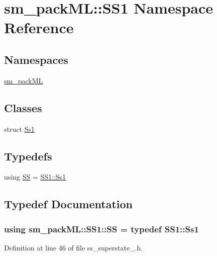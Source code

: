 \hypertarget{namespacesm__packML_1_1SS1}{}\section{sm\+\_\+pack\+ML\+:\+:S\+S1 Namespace Reference}
\label{namespacesm__packML_1_1SS1}
\subsection*{Namespaces}
\begin{DoxyCompactItemize}
\item 
 \hyperlink{namespacesm__packML_1_1SS1_1_1sm__packML}{sm\+\_\+pack\+ML}
\end{DoxyCompactItemize}
\subsection*{Classes}
\begin{DoxyCompactItemize}
\item 
struct \hyperlink{structsm__packML_1_1SS1_1_1Ss1}{Ss1}
\end{DoxyCompactItemize}
\subsection*{Typedefs}
\begin{DoxyCompactItemize}
\item 
using \hyperlink{namespacesm__packML_1_1SS1_a5f8b8355586649e418946858b4b6dfe6}{SS} = \hyperlink{structsm__packML_1_1SS1_1_1Ss1}{S\+S1\+::\+Ss1}
\end{DoxyCompactItemize}


\subsection{Typedef Documentation}
\subsubsection[{\texorpdfstring{SS}{SS}}]{\setlength{\rightskip}{0pt plus 5cm}using {\bf sm\+\_\+pack\+M\+L\+::\+S\+S1\+::\+SS} = typedef {\bf S\+S1\+::\+Ss1}}\hypertarget{namespacesm__packML_1_1SS1_a5f8b8355586649e418946858b4b6dfe6}{}\label{namespacesm__packML_1_1SS1_a5f8b8355586649e418946858b4b6dfe6}


Definition at line 46 of file ss\+\_\+superstate\+\_.\+h.

